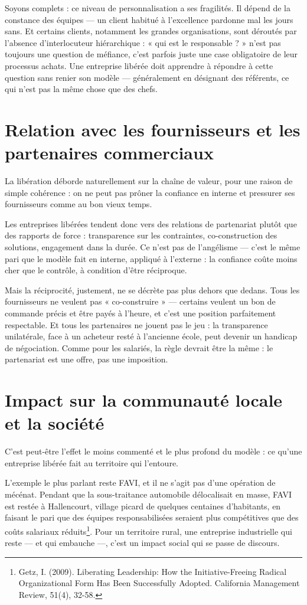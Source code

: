 Soyons complets : ce niveau de personnalisation a ses fragilités. Il dépend de la constance des équipes — un client habitué à l'excellence pardonne mal les jours sans. Et certains clients, notamment les grandes organisations, sont déroutés par l'absence d'interlocuteur hiérarchique : « qui est le responsable ? » n'est pas toujours une question de méfiance, c'est parfois juste une case obligatoire de leur processus achats. Une entreprise libérée doit apprendre à répondre à cette question sans renier son modèle — généralement en désignant des référents, ce qui n'est pas la même chose que des chefs.

\section{Relation avec les fournisseurs et les partenaires commerciaux}

La libération déborde naturellement sur la chaîne de valeur, pour une raison de simple cohérence : on ne peut pas prôner la confiance en interne et pressurer ses fournisseurs comme au bon vieux temps.

Les entreprises libérées tendent donc vers des relations de partenariat plutôt que des rapports de force : transparence sur les contraintes, co-construction des solutions, engagement dans la durée. Ce n'est pas de l'angélisme — c'est le même pari que le modèle fait en interne, appliqué à l'externe : la confiance coûte moins cher que le contrôle, à condition d'être réciproque.

Mais la réciprocité, justement, ne se décrète pas plus dehors que dedans. Tous les fournisseurs ne veulent pas « co-construire » — certains veulent un bon de commande précis et être payés à l'heure, et c'est une position parfaitement respectable. Et tous les partenaires ne jouent pas le jeu : la transparence unilatérale, face à un acheteur resté à l'ancienne école, peut devenir un handicap de négociation. Comme pour les salariés, la règle devrait être la même : le partenariat est une offre, pas une imposition.


\section{Impact sur la communauté locale et la société}

C'est peut-être l'effet le moins commenté et le plus profond du modèle : ce qu'une entreprise libérée fait au territoire qui l'entoure.

L'exemple le plus parlant reste FAVI, et il ne s'agit pas d'une opération de mécénat. Pendant que la sous-traitance automobile délocalisait en masse, FAVI est restée à Hallencourt, village picard de quelques centaines d'habitants, en faisant le pari que des équipes responsabilisées seraient plus compétitives que des coûts salariaux réduits\footnote{Getz, I. (2009). Liberating Leadership: How the Initiative-Freeing Radical Organizational Form Has Been Successfully Adopted. California Management Review, 51(4), 32-58.}. Pour un territoire rural, une entreprise industrielle qui reste — et qui embauche —, c'est un impact social qui se passe de discours.

